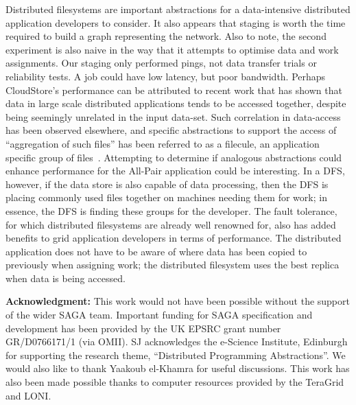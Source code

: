 \documentclass{rspublic}
\begin{document}
Distributed filesystems are important abstractions for a data-intensive
distributed application developers to consider. It also appears that
staging is worth the time required to build a graph representing the
network. Also to note, the second experiment is also naive in the way
that it attempts to optimise data and work assignments. Our staging only
performed pings, not data transfer trials or reliability tests. A job
could have low latency, but poor bandwidth. Perhaps CloudStore's
performance can be attributed to recent work that has shown that data in
large scale distributed applications tends to be accessed together,
despite being seemingly unrelated in the input data-set. Such
correlation in data-access has been observed elsewhere, and specific
abstractions to support the access of ``aggregation of such files'' has
been referred to as a filecule, an application specific group of
files~\citep{filecule}. Attempting to determine if analogous abstractions
could enhance performance for the All-Pair application could be
interesting.  In a DFS, however, if the data store is also capable of
data processing, then the DFS is placing commonly used files together on
machines needing them for work; in essence, the DFS is finding these
groups for the developer. The fault tolerance, for which distributed
filesystems are already well renowned for, also has added benefits to
grid application developers in terms of performance. The distributed
application does not have to be aware of where data has been copied to
previously when assigning work; the distributed filesystem uses the best
replica when data is being accessed.

{\bf Acknowledgment:} This work would not have been possible without the support of 
     the wider SAGA team. Important funding for SAGA
     specification and development has been provided by the UK EPSRC
     grant number GR/D0766171/1 (via OMII).  SJ acknowledges the
     e-Science Institute, Edinburgh for supporting the research theme,
     ``Distributed Programming Abstractions''.  We would also like to
     thank Yaakoub el-Khamra for useful discussions. This work has also
     been made possible thanks to computer resources provided by the
     TeraGrid and LONI.

%
 

\end{document}
